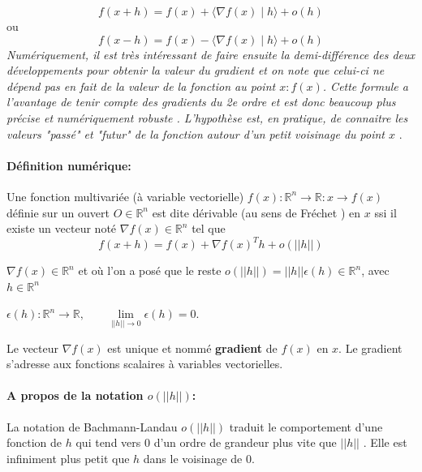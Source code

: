 		$${ 
			f(x+h)=f(x)+\langle \nabla f(x)\mid h\rangle +o(h) 
		}$$ 
		ou 
		$$ {  
			f(x-h)=f(x)-\langle \nabla f(x)\mid h\rangle +o(h)
		}$$
		\textit{Numériquement, il est très intéressant de faire ensuite la demi-différence des deux développements pour obtenir la valeur du gradient et on note que celui-ci ne dépend pas en fait de la valeur de la fonction au point $x : f (x)$. Cette formule a l'avantage de tenir compte des gradients du 2e ordre et est donc beaucoup plus précise et numériquement robuste \cite{jtshiman:2021}. L'hypothèse est, en pratique, de connaitre les valeurs "passé" et "futur" de la fonction autour d'un petit voisinage du point $x$} \cite{bierlaire2006introduction}.\\
		\paragraph*{Définition numérique:}
		Une fonction multivariée (à variable vectorielle)
		$ f(x)	: \mathbb{R}^n \rightarrow \mathbb{R} : x \rightarrow f(x) $ définie sur un ouvert $O \in \mathbb{R}^n$ est dite dérivable (au sens de Fréchet \cite{jtshiman:2021}) en $x$ ssi il existe un vecteur noté $\nabla f(x) \in \mathbb{R}^n$ tel que
		\begin{equation}
		f(x+h) = f(x) + \nabla f(x)^{T}h + o(||h||)
		\end{equation}
		
		$\nabla f(x) \in \mathbb{R}^n$ et où l’on a posé que le reste $o(||h||) = ||h||\epsilon (h) \in \mathbb{R}^n$, avec $h \in \mathbb{R}^n$ 
		\begin{center}
			$\epsilon (h): \mathbb{R}^n\rightarrow \mathbb{R}, \qquad \lim\limits_{||h|| \rightarrow 0} \epsilon(h)=0$.
		\end{center} 
		Le vecteur $\nabla f(x)$ est unique et nommé \textbf{gradient} de $f(x)$ en $x$.
		Le gradient s’adresse aux fonctions scalaires à variables vectorielles.
		\paragraph*{A propos de la notation \textbf{$o(||h||)$}:}
		La notation de Bachmann-Landau $o(||h||)$ traduit le comportement d’une fonction de $h$ qui tend vers $0$ d’un ordre de grandeur plus vite que $||h||$ \cite{coulombeau2013math}. Elle est infiniment plus petit que $h$ dans le voisinage de $0$.
		

	
	
	
